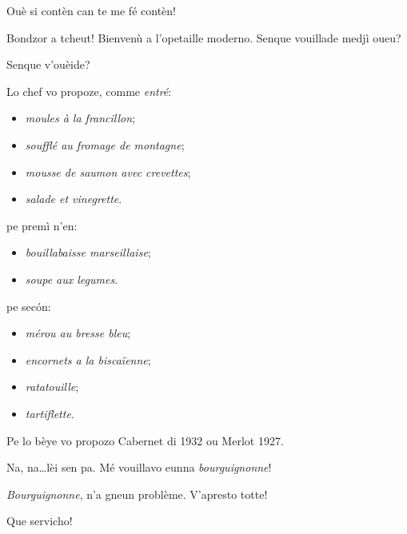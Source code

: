\begin{drama}
\PersEmpourtantaspeaks Ouè si contèn can te me fé contèn!


\Tsambrispeaks Bondzor a tcheut! Bienvenù a l’opetaille moderno. Sen\-que vouillade medjì oueu?

\PersEmpourtantaspeaks Senque v'ouèide?

\Tsambrispeaks {} Lo chef vo propoze, comme \textit{entré}:

\begin{itemize}
\item[--]  \textit{moules à la francillon};
\item[--]  \textit{soufflé au fromage de montagne};
\item[--]  \textit{mousse de saumon avec crevettes};
\item[--]  \textit{salade et vinegrette}.
\end{itemize}

pe premì n’en:

\begin{itemize}
\item[--]  \textit{bouillabaisse marseillaise};
\item[--]  \textit{soupe aux legumes}.
\end{itemize}

pe sec\'on:

\begin{itemize}
\item[--] \textit{mérou au bresse bleu};
\item[--]  \textit{encornets a la biscaïenne};
\item[--]  \textit{ratatouille};
\item[--]  \textit{tartiflette}.
\end{itemize}

Pe lo bèye vo propozo Cabernet di 1932 ou Merlot 1927.


\PersEmpourtantaspeaks Na, na\ldots lèi sen pa. Mé vouillavo eunna \textit{bourguignonne}!

\Tsambrispeaks \textit{Bourguignonne}, n'a gneun problème. V'apresto tot\-te!


\PersEmpourtantaspeaks{} Que servicho!


\end{drama}
